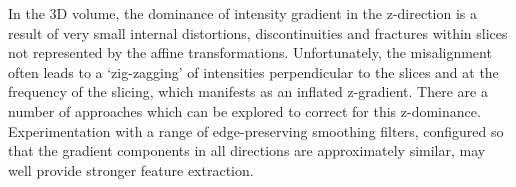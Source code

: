   In the 3D volume, the dominance of intensity gradient in the z-direction is a result of very small internal distortions, discontinuities and fractures within slices not represented by the affine transformations. Unfortunately, the misalignment often leads to a `zig-zagging' of intensities perpendicular to the slices and at the frequency of the slicing, which manifests as an inflated z-gradient. There are a number of approaches which can be explored to correct for this z-dominance. Experimentation with a range of edge-preserving smoothing filters, configured so that the gradient components in all directions are approximately similar, may well provide stronger feature extraction. 
\label{sec:discussion}
  


